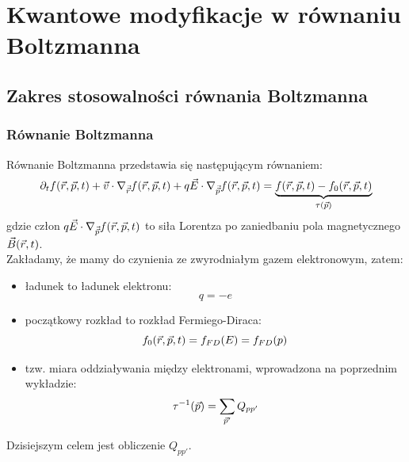 
\section{Kwantowe modyfikacje w równaniu Boltzmanna}

\subsection{Zakres stosowalności równania Boltzmanna}
\subsubsection{Równanie Boltzmanna}
Równanie Boltzmanna przedstawia się następującym równaniem:
\begin{equation}
\partial_t f(\vec{r},\vec{p},t)+\vec{v}\cdot\nabla_{\vec{\vec{r}}}f(\vec{r},\vec{p},t) 
+ q\vec{E}\cdot\nabla_{\vec{\vec{p}}}f(\vec{r},\vec{p},t)=\underbrace{f(\vec{r},\vec{p},t)-f_0(\vec{r},\vec{p},t)}_{\tau(\vec{p})}
\end{equation}
gdzie człon $q\vec{E}\cdot\nabla_{\vec{\vec{p}}}f(\vec{r},\vec{p},t)$ to siła Lorentza po zaniedbaniu pola magnetycznego $\vec{B}(\vec{r},t)$.\\
Zakładamy, że mamy do czynienia ze zwyrodniałym gazem elektronowym, zatem:
\begin{itemize}
\item ładunek to ładunek elektronu:
\begin{equation} q=-e \end{equation}
\item początkowy rozkład to rozkład Fermiego-Diraca:
\begin{equation} f_0(\vec{r},\vec{p},t)=f_{FD}(E)=f_{FD}(p)\end{equation}
\item tzw. miara oddziaływania między elektronami, wprowadzona na poprzednim wykładzie:
\begin{equation}
\tau^{-1}(\vec{p})=\sum_{\vec{p}'} Q_{pp'}\end{equation}
\end{itemize}
Dzisiejszym celem jest obliczenie $Q_{pp'}$.\\
